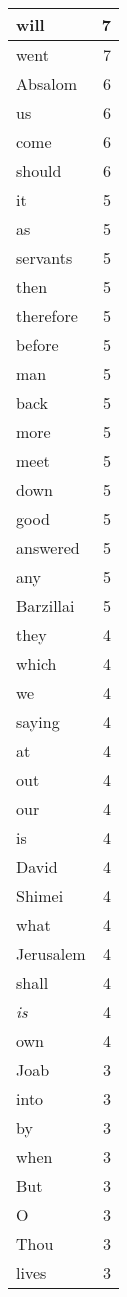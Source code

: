 \begin{center}
\begin{longtable}{l|r}
will & 7 \\ \hline
went & 7 \\ \hline
Absalom & 6 \\ \hline
us & 6 \\ \hline
come & 6 \\ \hline
should & 6 \\ \hline
it & 5 \\ \hline
as & 5 \\ \hline
servants & 5 \\ \hline
then & 5 \\ \hline
therefore & 5 \\ \hline
before & 5 \\ \hline
man & 5 \\ \hline
back & 5 \\ \hline
more & 5 \\ \hline
meet & 5 \\ \hline
down & 5 \\ \hline
good & 5 \\ \hline
answered & 5 \\ \hline
any & 5 \\ \hline
Barzillai & 5 \\ \hline
they & 4 \\ \hline
which & 4 \\ \hline
we & 4 \\ \hline
saying & 4 \\ \hline
at & 4 \\ \hline
out & 4 \\ \hline
our & 4 \\ \hline
is & 4 \\ \hline
David & 4 \\ \hline
Shimei & 4 \\ \hline
what & 4 \\ \hline
Jerusalem & 4 \\ \hline
shall & 4 \\ \hline
\emph{is} & 4 \\ \hline
own & 4 \\ \hline
Joab & 3 \\ \hline
into & 3 \\ \hline
by & 3 \\ \hline
when & 3 \\ \hline
But & 3 \\ \hline
O & 3 \\ \hline
Thou & 3 \\ \hline
lives & 3 \\ \hline

\end{longtable}
\end{center}
